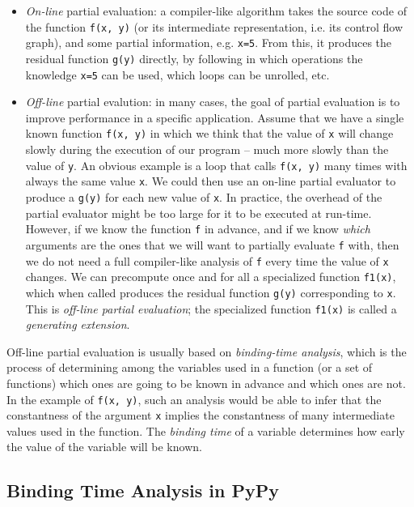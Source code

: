 \begin{itemize}
\item \emph{On-line} partial evaluation: a compiler-like algorithm takes the
source code of the function \texttt{f(x, y)} (or its intermediate representation,
i.e. its control flow graph), and some partial
information, e.g. \texttt{x=5}.  From this, it produces the residual function
\texttt{g(y)} directly, by following in which operations the knowledge \texttt{x=5} can
be used, which loops can be unrolled, etc.

\item \emph{Off-line} partial evalution: in many cases, the goal of partial
evaluation is to improve performance in a specific application.  Assume that we
have a single known function \texttt{f(x, y)} in which we think that the value
of \texttt{x} will change slowly during the execution of our program – much
more slowly than the value of \texttt{y}.  An obvious example is a loop that
calls \texttt{f(x, y)} many times with always the same value \texttt{x}.  We
could then use an on-line partial evaluator to produce a \texttt{g(y)} for each
new value of \texttt{x}.  In practice, the overhead of the partial evaluator
might be too large for it to be executed at run-time.  However, if we know the
function \texttt{f} in advance, and if we know \emph{which} arguments are the
ones that we will want to partially evaluate \texttt{f} with, then we do not
need a full compiler-like analysis of \texttt{f} every time the value of
\texttt{x} changes.  We can precompute once and for all a specialized function
\texttt{f1(x)}, which when called produces the residual function \texttt{g(y)}
corresponding to \texttt{x}.  This is \emph{off-line partial evaluation}; the
specialized function \texttt{f1(x)} is called a \emph{generating extension}.
\end{itemize}

Off-line partial evaluation is usually based on \emph{binding-time analysis}, which
is the process of determining among the variables used in a function (or
a set of functions) which ones are going to be known in advance and
which ones are not.  In the example of \texttt{f(x, y)}, such an analysis
would be able to infer that the constantness of the argument \texttt{x}
implies the constantness of many intermediate values used in the
function.  The \emph{binding time} of a variable determines how early the
value of the variable will be known.

\subsection{Binding Time Analysis in PyPy}

